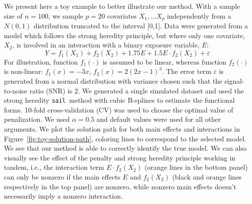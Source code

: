 \documentclass[12pt,letter]{article}\usepackage[]{graphicx}\usepackage[]{color}
\newcommand{\sail}{\texttt{sail}}
\begin{document}
We present here a toy example to better illustrate our method. With a sample size of $n=100$, we sample $p=20$ covariates $X_1, \ldots X_p$ independently from a $N(0,1)$ distribution truncated to the interval [0,1]. Data were generated from a model which follows the strong heredity principle, but where only one covariate, $X_2$, is involved in an interaction with a binary exposure variable, $E$:
\begin{equation}
	Y = f_1(X_1) + f_2(X_2) + 1.75 E + 1.5 E \cdot f_2(X_2) + \varepsilon
\end{equation}
For illustration, function $f_1(\cdot)$ is assumed to be linear, whereas function $f_2(\cdot)$ is non-linear: $f_1(x) = -3x$, $f_2(x) = 2(2x-1)^3$. The error term $\varepsilon$ is generated from a normal distribution with variance chosen such that the signal-to-noise ratio (SNR) is 2.  We generated a single simulated dataset and used the strong heredity \sail ~method with cubic B-splines to estimate the functional forms. 10-fold cross-validation (CV) was used to choose the optimal value of penalization. We used $\alpha=0.5$ and default values were used for all other arguments. We plot the solution path for both main effects and interactions in Figure~\ref{fig:toy-solution-path}, coloring lines to correspond to the selected model. We see that our method is able to correctly identify the true model. We can also visually see the effect of the penalty and strong heredity principle working in tandem, i.e., the interaction term $E \cdot f_2(X_2)$ (orange lines in the bottom panel) can only be nonzero if the main effects $E$ and $f_2(X_2)$ (black and orange lines respectively in the top panel) are nonzero, while nonzero main effects doesn't necessarily imply a nonzero interaction.
\end{document}
